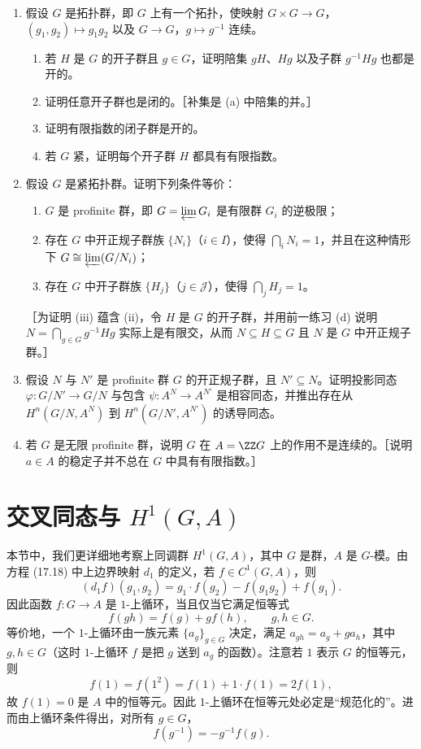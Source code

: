 \begin{enumerate}[label=\arabic*.]
  \item 假设 $G$ 是拓扑群，即 $G$ 上有一个拓扑，使映射 $G\times G\to G$，$(g_1,g_2)\mapsto g_1g_2$ 以及 $G\to G$，$g\mapsto g^{-1}$ 连续。
  \begin{enumerate}[label=(\alph*)]
    \item 若 $H$ 是 $G$ 的开子群且 $g\in G$，证明陪集 $gH$、$Hg$ 以及子群 $g^{-1}Hg$ 也都是开的。
    \item 证明任意开子群也是闭的。［补集是 (a) 中陪集的并。］
    \item 证明有限指数的闭子群是开的。
    \item 若 $G$ 紧，证明每个开子群 $H$ 都具有有限指数。
  \end{enumerate}

  \item 假设 $G$ 是紧拓扑群。证明下列条件等价：
  \begin{enumerate}[label=(\roman*)]
    \item $G$ 是 profinite 群，即 $G=\varprojlim G_i$ 是有限群 $G_i$ 的逆极限；
    \item 存在 $G$ 中开正规子群族 $\{N_i\}$（$i\in I$），使得 $\bigcap_iN_i=1$，并且在这种情形下 $G\cong\varprojlim(G/N_i)$；
    \item 存在 $G$ 中开子群族 $\{H_j\}$（$j\in\mathcal J$），使得 $\bigcap_jH_j=1$。
  \end{enumerate}
  ［为证明 (iii) 蕴含 (ii)，令 $H$ 是 $G$ 的开子群，并用前一练习 (d) 说明 $N=\bigcap_{g\in G}g^{-1}Hg$ 实际上是有限交，从而 $N\subseteq H\subseteq G$ 且 $N$ 是 $G$ 中开正规子群。］

  \item 假设 $N$ 与 $N'$ 是 profinite 群 $G$ 的开正规子群，且 $N'\subseteq N$。证明投影同态 $\varphi:G/N'\to G/N$ 与包含 $\psi:A^N\to A^{N'}$ 是相容同态，并推出存在从 $H^n(G/N,A^N)$ 到 $H^n(G/N',A^{N'})$ 的诱导同态。

  \item 若 $G$ 是无限 profinite 群，说明 $G$ 在 $A=\ZZ G$ 上的作用不是连续的。［说明 $a\in A$ 的稳定子并不总在 $G$ 中具有有限指数。］
\end{enumerate}

\section[交叉同态与 H1(G,A)]{交叉同态与 $H^1(G,A)$}

本节中，我们更详细地考察上同调群 $H^1(G,A)$，其中 $G$ 是群，$A$ 是 $G$-模。由方程 (17.18) 中上边界映射 $d_1$ 的定义，若 $f\in C^1(G,A)$，则
\[
  (d_1f)(g_1,g_2)=g_1\cdot f(g_2)-f(g_1g_2)+f(g_1).
\]
因此函数 $f:G\to A$ 是 $1$-上循环，当且仅当它满足恒等式
\[
  f(gh)=f(g)+g f(h),
  \qquad g,h\in G.
  \tag{17.20}
\]
等价地，一个 $1$-上循环由一族元素 $\{a_g\}_{g\in G}$ 决定，满足 $a_{gh}=a_g+ga_h$，其中 $g,h\in G$（这时 $1$-上循环 $f$ 是把 $g$ 送到 $a_g$ 的函数）。注意若 $1$ 表示 $G$ 的恒等元，则
\[
  f(1)=f(1^2)=f(1)+1\cdot f(1)=2f(1),
\]
故 $f(1)=0$ 是 $A$ 中的恒等元。因此 $1$-上循环在恒等元处必定是“规范化的”。进而由上循环条件得出，对所有 $g\in G$，
\[
  f(g^{-1})=-g^{-1}f(g).
\]

